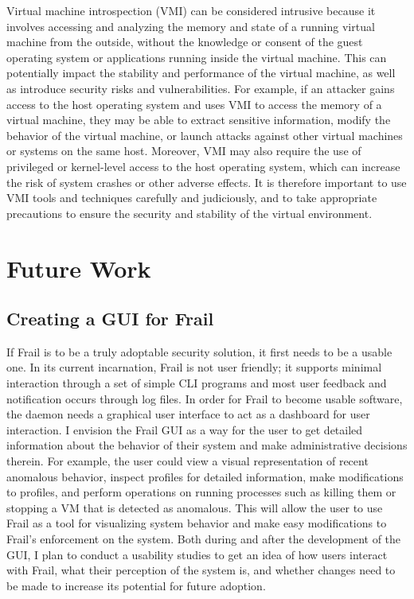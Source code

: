 \documentclass{report}
\begin{document}
\begin{spacing}{1.5}
{\large
Virtual machine introspection (VMI) can be considered intrusive because it involves accessing and analyzing the memory and state of a running virtual machine from the outside, without the knowledge or consent of the guest operating system or applications running inside the virtual machine. This can potentially impact the stability and performance of the virtual machine, as well as introduce security risks and vulnerabilities. For example, if an attacker gains access to the host operating system and uses VMI to access the memory of a virtual machine, they may be able to extract sensitive information, modify the behavior of the virtual machine, or launch attacks against other virtual machines or systems on the same host. Moreover, VMI may also require the use of privileged or kernel-level access to the host operating system, which can increase the risk of system crashes or other adverse effects. It is therefore important to use VMI tools and techniques carefully and judiciously, and to take appropriate precautions to ensure the security and stability of the virtual environment.
\newline
}






\chapter{Future Work}

\section{Creating a GUI for Frail}


{\large
If Frail is to be a truly adoptable security solution, it first needs to be a usable one. In its current incarnation, Frail is not user friendly; it supports minimal interaction through a set of simple CLI programs and most user feedback and notification occurs through log files. In order for Frail to become usable software, the daemon needs a graphical user interface to act as a dashboard for user interaction. I envision the Frail GUI as a way for the user to get detailed information about the behavior of their system and make administrative decisions therein. For example, the user could view a visual representation of recent anomalous behavior, inspect profiles for detailed information, make modifications to profiles, and perform operations on running processes such as killing
them or stopping a VM that is detected as anomalous. This will allow the user to use Frail as a tool for visualizing system behavior and make easy modifications to Frail's enforcement on the system. Both during and after the development of the GUI, I plan to conduct a usability studies to get an idea of how users interact with Frail, what their perception of the system is, and whether changes need to be made to increase its potential for future adoption.
\newline
}





\end{spacing}
\end{document}
